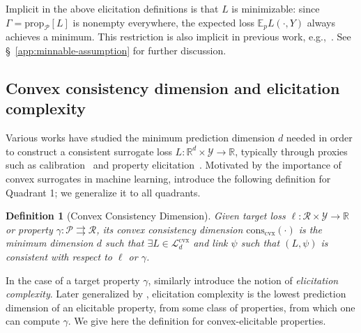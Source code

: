 \documentclass{article} %
\newcommand{\Comments}{0}
\newcommand{\mytodo}[2]{\ifnum\Comments=1%
	\todo[linecolor=#1!80!black,backgroundcolor=#1,bordercolor=#1!80!black]{#2}\fi}
\newcommand{\jessiet}[1]{\mytodo{teal!20!white}{JF: #1}}
\newcommand{\btw}[1]{}%
\newcommand{\reals}{\mathbb{R}}
\newcommand{\prop}[2][\mathcal{P}]{\mathrm{prop}_{#1}[#2]}
\newcommand{\conscvx}{\mathrm{cons}_\mathrm{cvx}}
\newcommand{\E}{\mathbb{E}}
\newcommand{\Lcvx}{\mathcal{L}^{\mathrm{cvx}}}
\newcommand{\R}{\mathcal{R}}
\renewcommand{\P}{\mathcal{P}}
\newcommand{\Y}{\mathcal{Y}}
\newcommand{\exploss}[3]{\E_{#3} #1(#2,Y)}
\newcommand{\toto}{\rightrightarrows}
\newtheorem{definition}{Definition}
\begin{document}
Implicit in the above elicitation definitions is that $L$ is minimizable: since $\Gamma = \prop[\P]{L}$ is nonempty everywhere, the expected loss $\exploss{L}{\cdot}{p}$ always achieves a minimum.
This restriction is also implicit in previous work, e.g.,~\citep{agarwal2015consistent}.
See \S~\ref{app:minnable-assumption} for further discussion.

\subsection{Convex consistency dimension and elicitation complexity}\label{subsec:complexity}

Various works have studied the minimum prediction dimension $d$ needed in order to construct a consistent surrogate loss $L: \reals^d \times \Y \to \reals$, typically through proxies such as calibration~\citep{steinwart2008support,agarwal2015consistent,ramaswamy2016convex} and property elicitation~\citep{frongillo2015vector-valued,fissler2016higher,frongillo2020elicitation}.
Motivated by the importance of convex surrogates in machine learning, \citet{ramaswamy2016convex}
introduce the following definition for Quadrant 1; we generalize it to all quadrants.

\begin{definition}[Convex Consistency Dimension]\label{def:cvx-consistency-dim}
  Given target loss $\ell:\R \times\Y \to \reals$ or property $\gamma: \P \toto \R$, its \emph{convex consistency dimension} $\conscvx(\cdot)$ is the minimum dimension $d$ such that $\exists L \in \Lcvx_d$ and link $\psi$ such that $(L,\psi)$ is consistent with respect to $\ell$ or $\gamma$.
\end{definition}

In the case of a target property $\gamma$, \citet{lambert2008eliciting} similarly introduce the notion of \emph{elicitation complexity}.
Later generalized by \citet{frongillo2020elicitation}, elicitation complexity is the lowest prediction dimension of an elicitable property, from some class of properties, from which one can compute $\gamma$.
We give here the definition for convex-elicitable properties.
\end{document}
